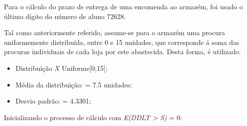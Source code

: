 Para o cálculo do prazo de entrega de uma encomenda ao armazém, foi usado o último dígito do número de aluno 72628.

Tal como anteriormente referido, assume-se para o armazém uma procura uniformemente distribuída, entre 0 e 15 unidades, que corresponde á soma das procuras individuais de cada loja por este abastecida. Desta forma, é utilizado:

\begin{itemize}
\item Distribuição \emph{X} \approx Uniforme[0;15];
\item Média da distribuição:  = 7.5 unidades;
\item Desvio padrão:  = 4.3301;
\end{itemize}

Inicializando o processo de cálculo com \emph{E(DDLT > S)} = 0:

